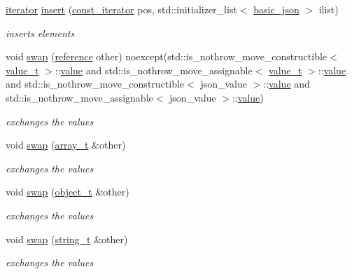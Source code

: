 \begin{DoxyCompactItemize}
\mbox{\hyperlink{classnlohmann_1_1basic__json_a099316232c76c034030a38faa6e34dca}{iterator}} \mbox{\hyperlink{classnlohmann_1_1basic__json_ad154c4228e4867c67b25a6601ced89bd}{insert}} (\mbox{\hyperlink{classnlohmann_1_1basic__json_a41a70cf9993951836d129bb1c2b3126a}{const\+\_\+iterator}} pos, std\+::initializer\+\_\+list$<$ \mbox{\hyperlink{classnlohmann_1_1basic__json}{basic\+\_\+json}} $>$ ilist)
\begin{DoxyCompactList}\small\item\em inserts elements \end{DoxyCompactList}\item 
void \mbox{\hyperlink{classnlohmann_1_1basic__json_a8c9d932353e1ab98a7dc2fc27e002031}{swap}} (\mbox{\hyperlink{classnlohmann_1_1basic__json_ac6a5eddd156c776ac75ff54cfe54a5bc}{reference}} other) noexcept(std\+::is\+\_\+nothrow\+\_\+move\+\_\+constructible$<$ \mbox{\hyperlink{namespacenlohmann_1_1detail_a90aa5ef615aa8305e9ea20d8a947980f}{value\+\_\+t}} $>$\+::\mbox{\hyperlink{classnlohmann_1_1basic__json_af9c51328fbe1da75eca750be3009917a}{value}} and std\+::is\+\_\+nothrow\+\_\+move\+\_\+assignable$<$ \mbox{\hyperlink{namespacenlohmann_1_1detail_a90aa5ef615aa8305e9ea20d8a947980f}{value\+\_\+t}} $>$\+::\mbox{\hyperlink{classnlohmann_1_1basic__json_af9c51328fbe1da75eca750be3009917a}{value}} and std\+::is\+\_\+nothrow\+\_\+move\+\_\+constructible$<$ json\+\_\+value $>$\+::\mbox{\hyperlink{classnlohmann_1_1basic__json_af9c51328fbe1da75eca750be3009917a}{value}} and std\+::is\+\_\+nothrow\+\_\+move\+\_\+assignable$<$ json\+\_\+value $>$\+::\mbox{\hyperlink{classnlohmann_1_1basic__json_af9c51328fbe1da75eca750be3009917a}{value}})
\begin{DoxyCompactList}\small\item\em exchanges the values \end{DoxyCompactList}\item 
void \mbox{\hyperlink{classnlohmann_1_1basic__json_a65b0a24e1361a030ad0a661de22f6c8e}{swap}} (\mbox{\hyperlink{classnlohmann_1_1basic__json_ae095578e03df97c5b3991787f1056374}{array\+\_\+t}} \&other)
\begin{DoxyCompactList}\small\item\em exchanges the values \end{DoxyCompactList}\item 
void \mbox{\hyperlink{classnlohmann_1_1basic__json_ac31f12587d2f1a3be5ffc394aa9d72a4}{swap}} (\mbox{\hyperlink{classnlohmann_1_1basic__json_aa1eb13d5aa86f80cbee6c58e90fbaf49}{object\+\_\+t}} \&other)
\begin{DoxyCompactList}\small\item\em exchanges the values \end{DoxyCompactList}\item 
void \mbox{\hyperlink{classnlohmann_1_1basic__json_adaa1ed0a889d86c8e0216a3d66980f76}{swap}} (\mbox{\hyperlink{classnlohmann_1_1basic__json_a61f8566a1a85a424c7266fb531dca005}{string\+\_\+t}} \&other)
\begin{DoxyCompactList}\small\item\em exchanges the values \end{DoxyCompactList}\end{DoxyCompactItemize}
